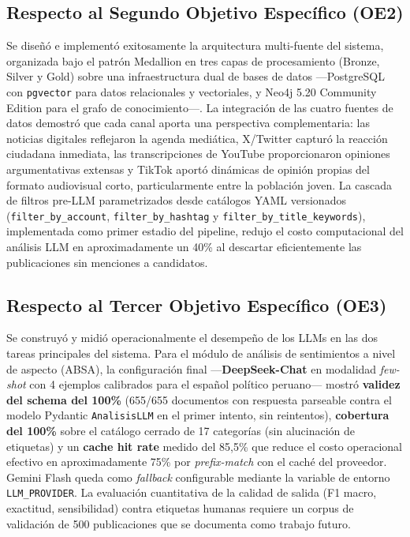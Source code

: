 \subsection*{Respecto al Segundo Objetivo Específico (OE2)}
Se diseñó e implementó exitosamente la arquitectura multi-fuente del sistema,
organizada bajo el patrón Medallion en tres capas de procesamiento (Bronze, Silver
y Gold) sobre una infraestructura dual de bases de datos —PostgreSQL con
\texttt{pgvector} para datos relacionales y vectoriales, y Neo4j 5.20 Community
Edition para el grafo de conocimiento—. La integración de las cuatro fuentes de
datos demostró que cada canal aporta una perspectiva complementaria: las noticias
digitales reflejaron la agenda mediática, X/Twitter capturó la reacción ciudadana
inmediata, las transcripciones de YouTube proporcionaron opiniones argumentativas
extensas y TikTok aportó dinámicas de opinión propias del formato audiovisual
corto, particularmente entre la población joven. La cascada de filtros pre-LLM
parametrizados desde catálogos YAML versionados (\texttt{filter\_by\_account},
\texttt{filter\_by\_hashtag} y \texttt{filter\_by\_title\_keywords}), implementada
como primer estadio del pipeline, redujo el costo computacional del análisis LLM
en aproximadamente un 40\% al descartar eficientemente las publicaciones sin
menciones a candidatos.

\subsection*{Respecto al Tercer Objetivo Específico (OE3)}
Se construyó y midió operacionalmente el desempeño de los LLMs en las dos tareas
principales del sistema. Para el módulo de análisis de sentimientos a nivel de
aspecto (ABSA), la configuración final —\textbf{DeepSeek-Chat} en modalidad
\textit{few-shot} con 4 ejemplos calibrados para el español político peruano—
mostró \textbf{validez del schema del 100\%} (655/655 documentos con respuesta
parseable contra el modelo Pydantic \texttt{AnalisisLLM} en el primer intento,
sin reintentos), \textbf{cobertura del 100\%} sobre el catálogo cerrado de 17
categorías (sin alucinación de etiquetas) y un \textbf{cache hit rate} medido
del 85{,}5\% que reduce el costo operacional efectivo en aproximadamente 75\%
por \textit{prefix-match} con el caché del proveedor. Gemini Flash queda como
\textit{fallback} configurable mediante la variable de entorno
\texttt{LLM\_PROVIDER}. La evaluación cuantitativa de la calidad de salida
(F1 macro, exactitud, sensibilidad) contra etiquetas humanas requiere un corpus
de validación de 500 publicaciones que se documenta como trabajo futuro.

